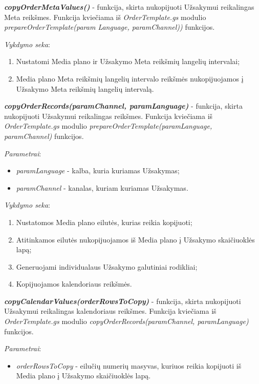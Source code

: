 \bigskip
\textit{\textbf{copyOrderMetaValues()}} - funkcija, skirta nukopijuoti Užsakymui reikalingas Meta reikšmes. Funkcija kviečiama iš \textit{OrderTemplate.gs} modulio \textit{prepareOrderTemplate(param Language, paramChannel))} funkcijos.

\bigskip
\textit{Vykdymo seka}:
\begin{enumerate}
    \itemsep0em 
    \item Nustatomi Media plano ir Užsakymo Meta reikšmių langelių intervalai;
    \item Media plano Meta reikšmių langelių intervalo reikšmės nukopijuojamos į Užsakymo Meta reikšmių langelių intervalą.
\end{enumerate}

\bigskip
\textit{\textbf{copyOrderRecords(paramChannel, paramLanguage)}} - funkcija, skirta nukopijuoti Užsakymui reikalingas reikšmes. Funkcija kviečiama iš \textit{OrderTemplate.gs} modulio \textit{prepareOrderTemplate(paramLanguage, paramChannel)} funkcijos.

\bigskip
\textit{Parametrai}:
\begin{itemize}
    \itemsep0em 
    \item \textit{paramLanguage} - kalba, kuria kuriamas Užsakymas;
    \item \textit{paramChannel} - kanalas, kuriam kuriamas Užsakymas.
\end{itemize}

\bigskip
\textit{Vykdymo seka}:
\begin{enumerate}
    \itemsep0em 
    \item Nustatomos Media plano eilutės, kurias reikia kopijuoti;
    \item Atitinkamos eilutės nukopijuojamos iš Media plano į Užsakymo skaičiuoklės lapą;
    \item Generuojami individualaus Užsakymo galutiniai rodikliai;
    \item Kopijuojamos kalendoriaus reikšmės.
\end{enumerate}

\bigskip
\textit{\textbf{copyCalendarValues(orderRowsToCopy)}} - funkcija, skirta nukopijuoti Užsakymui reikalingas kalendoriaus reikšmes. Funkcija kviečiama iš \textit{OrderTemplate.gs} modulio \textit{copyOrderRecords(paramChannel, paramLanguage)} funkcijos.

\bigskip
\textit{Parametrai}:
\begin{itemize}
    \itemsep0em 
    \item \textit{orderRowsToCopy} - eilučių numerių masyvas, kuriuos reikia kopijuoti iš Media plano į Užsakymo skaičiuoklės lapą.
\end{itemize}

